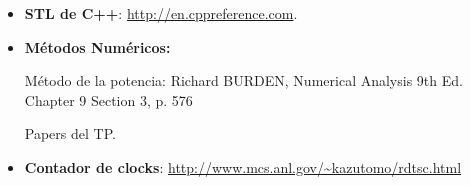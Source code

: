 \begin{itemize}
	\item \textbf{STL de C++}: \url{http://en.cppreference.com}.
	\item \textbf{Métodos Numéricos:}
		\par Método de la potencia: Richard BURDEN, Numerical Analysis 9th Ed. Chapter 9 Section 3, p. 576
		\par Papers del TP.
	\item \textbf{Contador de clocks}: \url{http://www.mcs.anl.gov/\~kazutomo/rdtsc.html}
\end{itemize}



